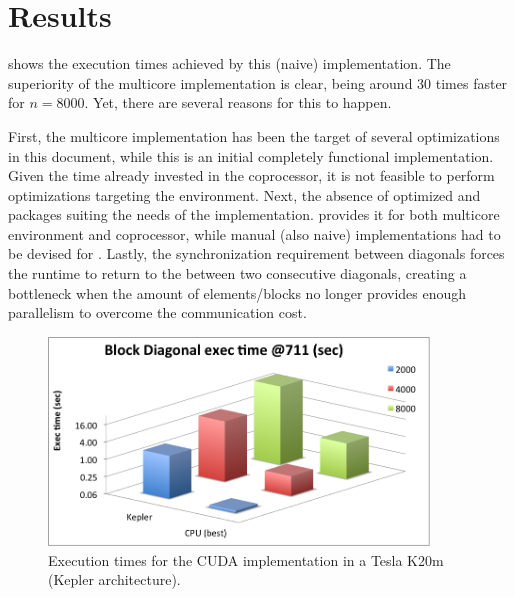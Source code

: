 \documentclass[../thesis]{subfiles}
\begin{document}
	\section{Results}
	\label{sec:cuda:results}

	 shows the execution times achieved by this (naive) \cuda implementation. The superiority of the multicore implementation is clear, being around 30 times faster for $n=8000$. Yet, there are several reasons for this to happen.

	First, the multicore implementation has been the target of several optimizations in this document, while this is an initial completely functional \cuda implementation. Given the time already invested in the \intel\xeonphi coprocessor, it is not feasible to perform optimizations targeting the \cuda environment. Next, the absence of optimized \blas and \lapack packages suiting the needs of the implementation. \mkl provides it for both multicore environment and coprocessor, while manual (also naive) implementations had to be devised for \cuda. Lastly, the synchronization requirement between diagonals forces the runtime to return to the \cpu between two consecutive diagonals, creating a bottleneck when the amount of elements/blocks no longer provides enough parallelism to overcome the communication cost.

	\begin{figure}[htp]
		\begin{center}
			\includegraphics[width=0.9\textwidth]{assets/images/cuda/times.png}
		\end{center}
		\caption{Execution times for the CUDA implementation in a Tesla K20m (Kepler architecture).}
		\label{fig:cuda:results:times}
	\end{figure}
\end{document}
